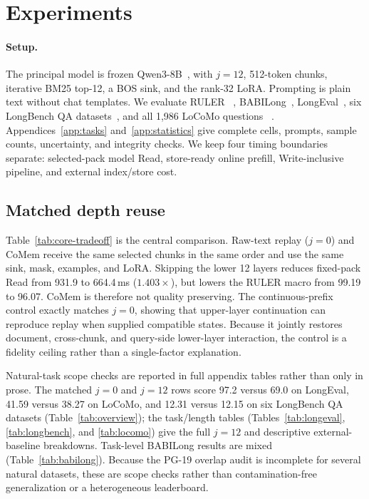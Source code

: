 \section{Experiments}
\label{sec:experiments}

\paragraph{Setup.}
The principal model is frozen Qwen3-8B~\citep{qwen3}, with $j{=}12$,
512-token chunks, iterative BM25 top-12, a BOS sink, and the rank-32 LoRA.
Prompting is plain text without chat templates. We evaluate RULER
~\citep{ruler}, BABILong~\citep{babilong}, LongEval~\citep{longchat}, six
LongBench QA datasets~\citep{longbench}, and all 1,986 LoCoMo questions
~\citep{locomo}. Appendices~\ref{app:tasks} and~\ref{app:statistics} give
complete cells, prompts, sample counts, uncertainty, and integrity checks. We keep four
timing boundaries separate: selected-pack model Read, store-ready online
prefill, Write-inclusive pipeline, and external index/store cost.

\subsection{Matched depth reuse}


Table~\ref{tab:core-tradeoff} is the central comparison. Raw-text replay
($j{=}0$) and CoMem receive the same selected chunks in the same order and use
the same sink, mask, examples, and LoRA. Skipping the lower 12 layers reduces
fixed-pack Read from 931.9 to 664.4\,ms ($1.403\times$), but lowers the RULER
macro from 99.19 to 96.07. CoMem is therefore not quality preserving. The
continuous-prefix control exactly matches $j{=}0$, showing that upper-layer
continuation can reproduce replay when supplied compatible states. Because it
jointly restores document, cross-chunk, and query-side lower-layer interaction,
the control is a fidelity ceiling rather than a single-factor explanation.

Natural-task scope checks are reported in full appendix tables rather than only
in prose. The matched $j{=}0$ and $j{=}12$ rows score 97.2 versus 69.0 on
LongEval, 41.59 versus 38.27 on LoCoMo, and 12.31 versus 12.15 on six
LongBench QA datasets (Table~\ref{tab:overview}); the task/length tables
(Tables~\ref{tab:longeval}, \ref{tab:longbench}, and \ref{tab:locomo}) give the
full $j{=}12$ and descriptive external-baseline breakdowns. Task-level BABILong
results are mixed (Table~\ref{tab:babilong}). Because the PG-19 overlap audit
is incomplete for several natural datasets, these are scope checks rather than
contamination-free generalization or a heterogeneous leaderboard.

